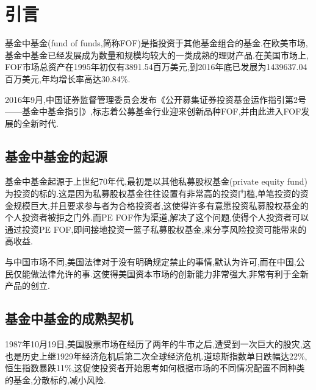 \section{引言}
基金中基金(fund of funds,简称FOF)是指投资于其他基金组合的基金.在欧美市场,基金中基金已经发展成为数量和规模均较大的一类成熟的理财产品.在美国市场上, FOF市场总资产在1995年初仅有3891.54百万美元,到2016年底已发展为1439637.04百万美元,年均增长率高达30.84\%.

2016年9月,中国证券监督管理委员会发布《公开募集证券投资基金运作指引第2号------基金中基金指引》,标志着公募基金行业迎来创新品种FOF,并由此进入FOF发展的全新时代.
\subsection{基金中基金的起源}

基金中基金起源于上世纪70年代,最初是以其他私募股权基金(private equity fund)为投资的标的.这是因为私募股权基金往往设置有非常高的投资门槛,单笔投资的资金规模巨大,并且要求参与者为合格投资者,这使得许多有意愿投资私募股权基金的个人投资者被拒之门外.而PE FOF作为渠道,解决了这个问题,使得个人投资者可以通过投资PE FOF,即间接地投资一篮子私募股权基金,来分享风险投资可能带来的高收益.

与中国市场不同,美国法律对于没有明确规定禁止的事情,默认为许可,而在中国,公民仅能做法律允许的事.这使得美国资本市场的创新能力非常强大,非常有利于全新产品的创立.

\subsection{基金中基金的成熟契机}

1987年10月19日,美国股票市场在经历了两年的牛市之后,遭受到一次巨大的股灾,这也是历史上继1929年经济危机后第二次全球经济危机.道琼斯指数单日跌幅达22\%,恒生指数暴跌11\%,这促使投资者开始思考如何根据市场的不同情况配置不同种类的基金,分散标的,减小风险.

